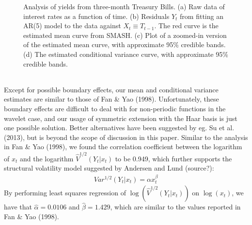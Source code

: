 \documentclass[12pt]{article}
\newcommand{\Ga}{\alpha}
\newcommand{\Gb}{\beta}
\begin{document}
\begin{figure}[h]
\begin{subfigure}[b]{0.4\textwidth}
        \caption{}
        \label{fig:tb_var}
    \end{subfigure}
    \caption{Analysis of yields from three-month Treasury Bills. (a) Raw data of interest rates as a function of time. (b) Residuals $Y_t$ from fitting an AR(5) model to the data against $X_t\equiv T_{t-1}$. The red curve is the estimated mean curve from SMASH. (c) Plot of a zoomed-in version of the estimated mean curve, with approximate 95\% credible bands. (d) The estimated conditional variance curve, with approximate 95\% credible bands.}
\end{figure}
\bigskip\\
Except for possible boundary effects, our mean and conditional variance estimates are similar to those of Fan \& Yao (1998). Unfortunately, these boundary effects are difficult to deal with for non-periodic functions in the wavelet case, and our usage of symmetric extension with the Haar basis is just one possible solution. Better alternatives have been suggested by eg. Su et al. (2013), but is beyond the scope of discussion in this paper. Similar to the analysis in Fan \& Yao (1998), we found the correlation coefficient between the logarithm of $x_t$ and the logarithm $\hat{V}^{1/2}(Y_t|x_t)$ to be 0.949, which further supports the structural volatility model suggested by Andersen and Lund (source?):
\begin{eqnarray}
Var^{1/2}(Y_t|x_t)=\Ga x_t^{\Gb}
\end{eqnarray}
By performing least squares regression of $\log(\hat{V}^{1/2}(Y_t|x_t))$ on $\log(x_t)$, we have that $\hat{\Ga}=0.0106$ and $\hat{\Gb}=1.429$, which are similar to the values reported in Fan \& Yao (1998).
\newpage
\end{document}
